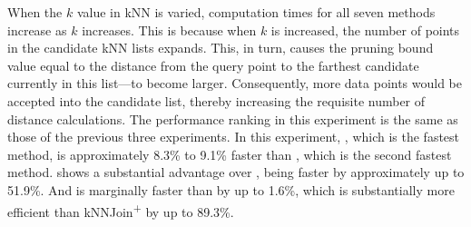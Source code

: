 When the $k$ value in kNN is varied, computation times for all seven methods increase as $k$ increases. This is because when $k$ is increased, the number of points in the candidate kNN lists expands. This, in turn, causes the pruning bound value equal to the distance from the query point to the farthest candidate currently in this list—to become larger. Consequently, more data points would be accepted into the candidate list, thereby increasing the requisite number of distance calculations. The performance ranking in this experiment is the same as those of the previous three experiments. In this experiment, \cpdualtree, which is the fastest method, is approximately 8.3\% to 9.1\% faster than \spdualtree, which is the second fastest method. \spdualtree shows a substantial advantage over \deltatree, being faster by approximately up to 51.9\%.
And \deltatree is marginally faster than \dualtree by up to 1.6\%, which is substantially more efficient than kNNJoin\textsuperscript{+} by up to 89.3\%.


